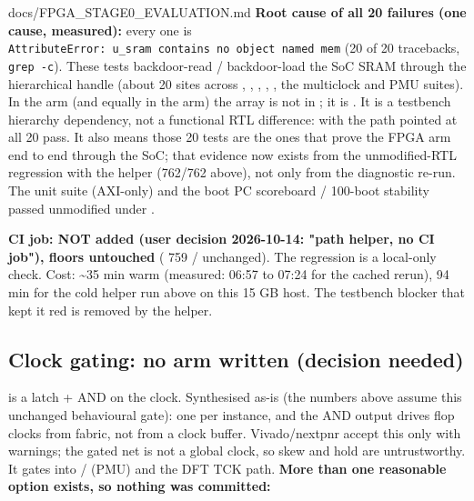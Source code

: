 \begin{relocated}{docs/FPGA_STAGE0_EVALUATION.md}
\textbf{Root cause of all 20 failures (one cause, measured):} every one
is
\texttt{AttributeError:\allowbreak{}\ u\_\allowbreak{}sram\ contains\ no\ object\ named\ mem}
(20 of 20 tracebacks, \texttt{grep\ -\allowbreak{}c}). These tests
backdoor-read / backdoor-load the SoC SRAM through the hierarchical
handle  (about 20 sites across
, ,
, ,
, the multiclock and PMU
suites). In the  arm (and equally in the 
arm) the array is not in ; it is
. It is a testbench hierarchy dependency,
not a functional RTL difference: with the path pointed at
 all 20 pass. It also means those 20 tests are the
ones that prove the  FPGA arm end to end through
the SoC; that evidence now exists from the unmodified-RTL regression
with the helper (762/762 above), not only from the diagnostic re-run.
The  unit suite (AXI-only) and the boot PC
scoreboard / 100-boot stability passed unmodified under .

\textbf{CI job: NOT added (user decision 2026-10-14: "path helper, no CI
job"), floors untouched} ( 759 / 
unchanged). The  regression is a local-only check. Cost:
\textasciitilde35 min warm (measured: 06:57 to 07:24 for the cached
 rerun), 94 min for the cold helper run above on this 15 GB
host. The testbench blocker that kept it red is removed by the helper.

\subsection{Clock gating: no arm written (decision needed)}\label{tm:dec:fpga-stage0-evaluation:6-clock-gating-no-arm-written-decision-needed}

 is a latch + AND on the clock. Synthesised as-is
(the numbers above assume this unchanged behavioural gate): one
 per instance, and the AND output drives flop clocks from
fabric, not from a clock buffer. Vivado/\allowbreak{}nextpnr accept this
only with warnings; the gated net is not a global clock, so skew and
hold are untrustworthy. It gates  into
/ (PMU) and the DFT TCK path. \textbf{More than
one reasonable option exists, so nothing was committed:}


\end{relocated}
